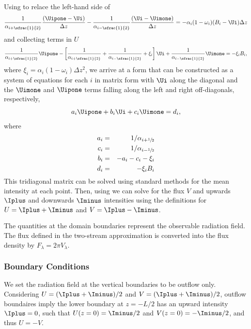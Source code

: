 Using  to relace the left-hand side of 
\begin{equation}
      \frac{1}{\alpha_{i+\sfrac{1}{2}}} \frac{(\Uipone - \Ui)}{\Delta z} 
    - \frac{1}{\alpha_{i-\sfrac{1}{2}}} \frac{(\Ui - \Uimone)}{\Delta z}  
    = - \alpha_i (1 - \omega_i)(B_i - \Ui) \Delta z
\end{equation}
and collecting terms in $U$
\begin{equation}
    \frac{1}{\alpha_{i+\sfrac{1}{2}}} \Uipone - \left[ \frac{1}{\alpha_{i+\sfrac{1}{2}}}+ \frac{1}{\alpha_{i-\sfrac{1}{2}}} + \xi_i  \right] \Ui + \frac{1}{\alpha_{i-\sfrac{1}{2}}} \Uimone  = - \xi_i B_i,
\end{equation}
where $\xi_i = \alpha_i (1 - \omega_i) \Delta z^2$, we arrive at a form that can be constructed as a system of equations for each $i$ in matrix form with $\Ui$ along the diagonal and the $\Uimone$ and $\Uipone$ terms falling along the left and right off-diagonals, respectively, 
\begin{equation}
    a_i \Uipone + b_i \Ui + c_i \Uimone = d_i, \label{eqn:system-in-U_i}
\end{equation}
where
\begin{eqnarray}
    a_i &=& 1/\alpha_{i+\sfrac{1}{2}} \\
    c_i &=& 1/\alpha_{i-\sfrac{1}{2}} \\
    b_i &=& -a_i - c_i - \xi_i \\
    d_i &=& - \xi_i B_i
\end{eqnarray}
This tridiagonal matrix can be solved using standard methods for the mean intensity at each point. Then, using  we can solve for the flux $V$ and upwards $\Iplus$ and downwards $\Iminus$ intensities using the definitions for $U = \Iplus + \Iminus$ and $V = \Iplus - \Iminus$.

The quantities at the domain boundaries represent the observable radiation field. The flux defined in the two-stream approximation is converted into the flux density by $F_\lambda = 2 \pi V_\lambda$.

\subsubsection{Boundary Conditions}
We set the radiation field at the vertical boundaries to be outflow only. Considering $U = (\Iplus + \Iminus) / 2$ and $V = (\Iplus + \Iminus) / 2$, outflow boundaires imply the lower boundary at $z=-L/2$ has an upward intensity $\Iplus=0$, such that $U(z=0) = \Iminus/2$ and $V(z=0)=-\Iminus/2$, and thus $U=-V$.

